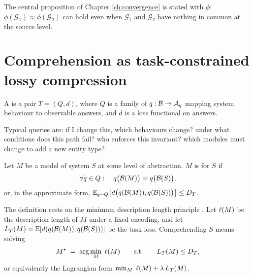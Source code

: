 The central proposition of Chapter \ref{ch:convergence} is stated with $\phi$:
$\phi(\mathcal{G}_1) \approx \phi(\mathcal{G}_2)$ can hold even when
$\mathcal{G}_1$ and $\mathcal{G}_2$ have nothing in common at the source level.

\section{Comprehension as task-constrained lossy compression}\label{sec:comprehension-formal}

\begin{definition}[Task]\label{def:task}
A  is a pair $T = (Q, d)$, where $Q$ is a family of 
$q : \mathcal{B} \to \mathcal{A}_q$ mapping system behaviour to observable answers, and $d$ is a
loss functional on answers.
\end{definition}

Typical queries are: if I change this, which behaviours change? under what conditions does
this path fail? who enforces this invariant? which modules must change to add a new entity
type?

\begin{definition}[$T$-sufficiency]\label{def:sufficient}
Let $M$ be a model of system $S$ at some level of abstraction. $M$ is
 for $S$ if
\begin{equation}\label{eq:sufficient}
\forall q \in Q:\quad q\bigl(\mathcal{B}(M)\bigr) = q\bigl(\mathcal{B}(S)\bigr),
\end{equation}
or, in the approximate form,
$\mathbb{E}_{q \sim Q}\bigl[d\bigl(q(\mathcal{B}(M)), q(\mathcal{B}(S))\bigr)\bigr] \le D_T$.
\end{definition}

\begin{definition}\label{def:mdl}
The definition rests on the minimum description length principle
\cite{rissanen1978,grunwald2006,grunwald2019}. Let $\ell(M)$ be the description length of
$M$ under a fixed encoding, and let
$L_T(M) = \mathbb{E}[d(q(\mathcal{B}(M)), q(\mathcal{B}(S)))]$ be the task loss. Comprehending $S$ means
solving
\begin{equation}\label{eq:ratedistortion}
M^{\star} \;=\; \arg\min_{M} \; \ell(M)
\qquad \text{s.t.} \qquad L_T(M) \le D_T ,
\end{equation}
or equivalently the Lagrangian form $\min_M \; \ell(M) + \lambda\, L_T(M)$.
\end{definition}

